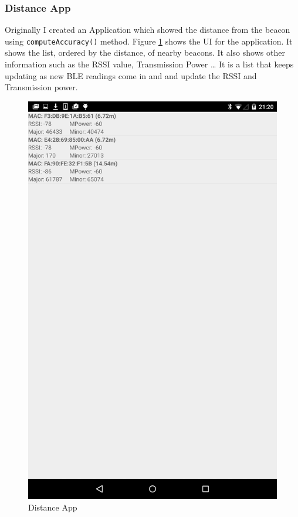 \subsubsection{Distance App} \label{nocamera_distanceapp}
Originally I created an Application which showed the distance from the beacon using \lstinline|computeAccuracy()| method. Figure \ref{distance_app_image} shows the UI for the application. It shows the list, ordered by the distance, of nearby beacons. It also shows other information such as the RSSI value, Transmission Power \ldots
It is a list that keeps updating as new BLE readings come in and and update the RSSI and Transmission power.

\begin{figure}[h]
  \includegraphics[scale=0.2]{images/distance}
  \protect\caption{Distance App} 
  \label{distance_app_image}
\end{figure}

